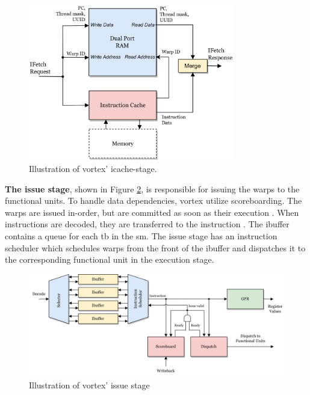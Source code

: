 \begin{figure}
    \centering
    \includegraphics[width=0.8\textwidth]{figures/Baseline Icache-stage.png}
    \caption{Illustration of \Gls{vortex}' icache-stage.}
    \label{fig:baseline_icache_stage}
\end{figure}

\vspace{1mm}\noindent
\textbf{The issue stage}, shown in Figure \ref{fig:baseline_issue_stage}, is responsible for issuing the warps to the functional units. To handle data dependencies, \Gls{vortex} utilize scoreboarding. The warps are issued in-order, but are committed as soon as their execution . When instructions are decoded, they are transferred to the instruction  . The ibuffer contains a queue for each \acrshort{tb} in the \acrshort{sm}. The issue stage has an instruction scheduler which schedules warps from the front of the ibuffer and dispatches it to the corresponding functional unit in the execution stage.

\begin{figure}
    \centering
    \includegraphics[width=\textwidth]{figures/Baseline Issue Stage.png}
    \caption{Illustration of \Gls{vortex}' issue stage}
    \label{fig:baseline_issue_stage}
\end{figure}

